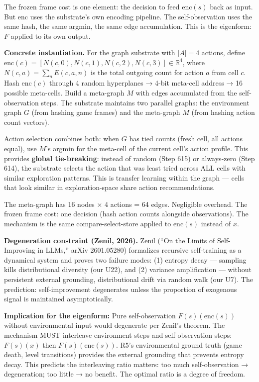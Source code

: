 \documentclass[
  11pt,
]{article}
\begin{document}
The frozen frame cost is one element: the decision to feed
\(\text{enc}(s)\) back as input. But \(\text{enc}\) uses the substrate's
own encoding pipeline. The self-observation uses the same hash, the same
argmin, the same edge accumulation. This is the eigenform: \(F\) applied
to its own output.

\textbf{Concrete instantiation.} For the graph substrate with
\(|A| = 4\) actions, define
\(\text{enc}(c) = [N(c,0), N(c,1), N(c,2), N(c,3)] \in \mathbb{R}^4\),
where \(N(c,a) = \sum_n E(c,a,n)\) is the total outgoing count for
action \(a\) from cell \(c\). Hash \(\text{enc}(c)\) through 4 random
hyperplanes → 4-bit meta-cell address → 16 possible meta-cells. Build a
meta-graph \(M\) with edges accumulated from the self-observation steps.
The substrate maintains two parallel graphs: the environment graph \(G\)
(from hashing game frames) and the meta-graph \(M\) (from hashing action
count vectors).

Action selection combines both: when \(G\) has tied counts (fresh cell,
all actions equal), use \(M\)'s argmin for the meta-cell of the current
cell's action profile. This provides \textbf{global tie-breaking}:
instead of random (Step 615) or always-zero (Step 614), the substrate
selects the action that was least tried across ALL cells with similar
exploration patterns. This is transfer learning within the graph ---
cells that look similar in exploration-space share action
recommendations.

The meta-graph has 16 nodes × 4 actions = 64 edges. Negligible overhead.
The frozen frame cost: one decision (hash action counts alongside
observations). The mechanism is the same compare-select-store applied to
\(\text{enc}(s)\) instead of \(x\).

\textbf{Degeneration constraint (Zenil, 2026).} Zenil (``On the Limits
of Self-Improving in LLMs,'' arXiv 2601.05280) formalizes recursive
self-training as a dynamical system and proves two failure modes: (1)
entropy decay --- sampling kills distributional diversity (our U22), and
(2) variance amplification --- without persistent external grounding,
distributional drift via random walk (our U7). The prediction:
self-improvement degenerates unless the proportion of exogenous signal
is maintained asymptotically.

\textbf{Implication for the eigenform:} Pure self-observation
\(F(s)(\text{enc}(s))\) without environmental input would degenerate per
Zenil's theorem. The mechanism MUST interleave environment steps and
self-observation steps: \(F(s)(x)\) then \(F(s)(\text{enc}(s))\). R5's
environmental ground truth (game death, level transitions) provides the
external grounding that prevents entropy decay. This predicts the
interleaving ratio matters: too much self-observation → degeneration;
too little → no benefit. The optimal ratio is a degree of freedom.
\end{document}
